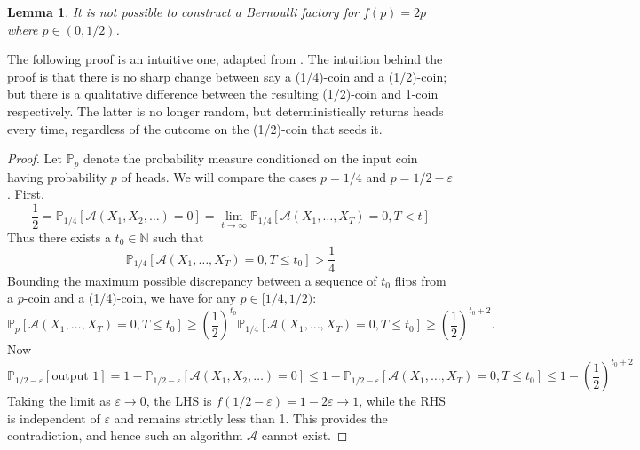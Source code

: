 \documentclass{article}
\newtheorem{lemma}{Lemma}
\theoremstyle{definition}
\newcommand{\PR}{\mathbb{P}}
\newcommand{\A}{\mathcal{A}}
\begin{document}
\begin{lemma}\label{thm:no_2p_bf}
It is not possible to construct a Bernoulli factory for $f(p)=2p$ where $p\in(0,1/2)$.
\end{lemma}
The following proof is an intuitive one, adapted from \citet[Corollary 3.3]{latuszynski2011}.
The intuition behind the proof is that there is no sharp change between say a (1/4)-coin and a (1/2)-coin; but there is a qualitative difference between the resulting (1/2)-coin and 1-coin respectively. The latter is no longer random, but deterministically returns heads every time, regardless of the outcome on the (1/2)-coin that seeds it.
\begin{proof}
Let $\PR_{p}$ denote the probability measure conditioned on the input coin having probability $p$ of heads. We will compare the cases $p=1/4$ and $p=1/2 - \varepsilon$.
First, 
\begin{equation*}
\frac{1}{2} = \PR_{1/4} [\A(X_1,X_2,\dots)=0] = \lim_{t\to\infty} \PR_{1/4} [\A(X_1,\dots,X_T)=0, T<t]
\end{equation*}
Thus there exists a $t_0 \in \mathbb{N}$ such that 
\begin{equation*}
\PR_{1/4} [\A(X_1,\dots,X_T)=0, T\leq t_0] > \frac{1}{4}
\end{equation*}
Bounding the maximum possible discrepancy between a sequence of $t_0$ flips from a $p$-coin and a (1/4)-coin, we have for any $p \in [1/4, 1/2)$:
\begin{equation*}
\PR_{p} [\A(X_1,\dots,X_T)=0, T\leq t_0] \geq \left(\frac{1}{2}\right)^{t_0} \PR_{1/4} [\A(X_1,\dots,X_T)=0, T\leq t_0] \geq \left(\frac{1}{2}\right)^{t_0+2}.
\end{equation*}
Now
\begin{equation*}
\PR_{1/2 - \varepsilon} [\text{output } 1] = 1-\PR_{1/2 - \varepsilon} [\A(X_1,X_2,\dots)=0]  \leq 1- \PR_{1/2 - \varepsilon} [\A(X_1,\dots,X_T)=0, T\leq t_0] \leq 1- \left(\frac{1}{2}\right)^{t_0+2}
\end{equation*}
Taking the limit as $\varepsilon\to 0$, the LHS is $f(1/2 - \varepsilon) = 1-2\varepsilon \rightarrow 1$, while the RHS is independent of $\varepsilon$ and remains strictly less than 1. This provides the contradiction, and hence such an algorithm $\A$ cannot exist.
\end{proof}
\end{document}
